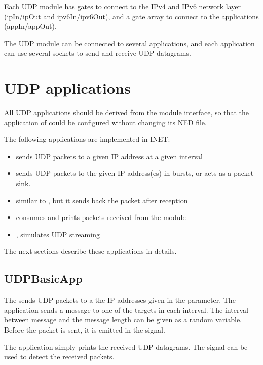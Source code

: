 Each UDP module has gates to connect to the IPv4 and IPv6 network layer
(ipIn/ipOut and ipv6In/ipv6Out), and a gate array to connect to the applications
(appIn/appOut).

The UDP module can be connected to several applications, and each application
can use several sockets to send and receive UDP datagrams.


\section{UDP applications}

All UDP applications should be derived from the  module interface,
so that the application of  could be configured without changing its NED file.

The following applications are implemented in INET:
\begin{itemize}
\item {} sends UDP packets to a given IP address at a given interval
\item {} sends UDP packets to the given IP address(es) in bursts, or acts as a packet sink.
\item {} similar to , but it sends back the packet after reception
\item {} consumes and prints packets received from the  module
\item {}, simulates UDP streaming
\end{itemize}

The next sections describe these applications in details.

\subsection{UDPBasicApp}

The  sends UDP packets to a the IP addresses given in the
 parameter. The application sends a message to one of the
targets in each  interval. The interval between message and
the message length can be given as a random variable. Before the packet is
sent, it is emitted in the  signal.

The application simply prints the received UDP datagrams. The 
signal can be used to detect the received packets.

